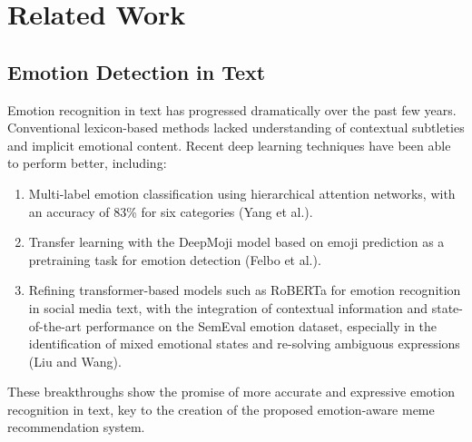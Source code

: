 \documentclass[conference]{IEEEtran}
\begin{document}
%

\section{Related Work}

\subsection{Emotion Detection in Text}
Emotion recognition in text has progressed dramatically
over the past few years. Conventional lexicon-based methods
lacked understanding of contextual subtleties and implicit
emotional content. Recent deep learning techniques have been
able to perform better, including:
\begin{enumerate}
    \item Multi-label emotion classification using hierarchical attention networks, with an accuracy of 83\% for six categories (Yang et al.).
    \item Transfer learning with the DeepMoji model based on emoji prediction as a pretraining task for emotion detection (Felbo et al.).
    \item Refining transformer-based models such as RoBERTa for emotion recognition in social media text, with the integration of contextual information and state-of-the-art performance on the SemEval emotion dataset, especially in the identification of mixed emotional states and re-solving ambiguous expressions (Liu and Wang).
\end{enumerate}

These breakthroughs show the promise of more accurate and expressive emotion recognition in text, key to the creation of the proposed emotion-aware meme recommendation system.
\end{document}
